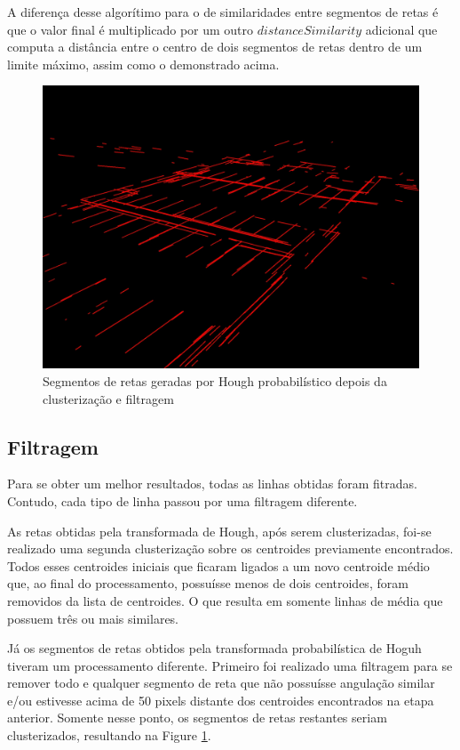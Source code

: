 \documentclass[10pt,twocolumn,letterpaper]{article}
\begin{document}
	A diferença desse algorítimo para o de similaridades entre segmentos de retas é que
o valor final é multiplicado por um outro $distanceSimilarity$ adicional que computa a distância
entre o centro de dois segmentos de retas dentro de um limite máximo, assim como o
demonstrado acima.

\begin{figure}[!htp]
\centering
\includegraphics[scale=0.15]{hough-segmentolinhas-cluster.jpg}
 \caption{Segmentos de retas geradas por Hough probabilístico depois da clusterização e filtragem}
\label{fig:segcluster}
\end{figure}

\subsection{Filtragem}

	Para se obter um melhor resultados, todas as linhas obtidas foram fitradas. Contudo,
cada tipo de linha passou por uma filtragem diferente.

	As retas obtidas pela transformada de Hough, após serem clusterizadas, foi-se realizado
uma segunda clusterização sobre os centroides previamente encontrados. Todos esses centroides
iniciais que ficaram ligados a um novo centroide médio que, ao final do processamento, possuísse
menos de dois centroides, foram removidos da lista de centroides. O que resulta em somente
linhas de média que possuem três ou mais similares.

	Já os segmentos de retas obtidos pela transformada probabilística de Hoguh tiveram um
processamento diferente. Primeiro foi realizado uma filtragem para se remover todo e qualquer
segmento de reta que não possuísse angulação similar e/ou estivesse acima de 50 pixels distante
dos centroides encontrados na etapa anterior. Somente nesse ponto, os segmentos de retas
restantes seriam clusterizados, resultando na Figure \ref{fig:segcluster}.
\end{document}
